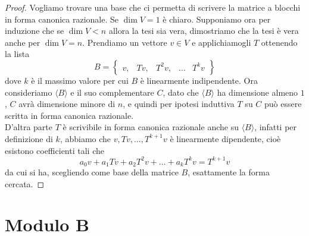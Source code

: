 \documentclass[11pt]{scrartcl}
\begin{document}
   	 \begin{proof}
   	 	Vogliamo trovare una base che ci permetta di scrivere la matrice a blocchi in forma canonica razionale. Se $\dim V=1$ è chiaro. Supponiamo ora per induzione che se $\dim V < n$ allora la tesi sia vera, dimostriamo che la tesi è vera anche per $\dim V=n$. Prendiamo un vettore $v\in V$ e applichiamogli $T$ ottenendo la lista
   	 	$$B=\left\{
   	 	\begin{array}{ccccc}
   	 		v, & Tv, & T^2v, & \dots & T^kv
   	 	\end{array}\right\}
   	 	$$
   	 	dove $k$ è il massimo valore per cui $B$ è linearmente indipendente. Ora consideriamo $\langle B \rangle$ e il suo complementare $C$, dato che $\langle B \rangle$ ha dimensione almeno $1$, $C$ avrà dimensione minore di $n$, e quindi per ipotesi induttiva $T$ su $C$ può essere scritta in forma canonica razionale. \\
   	 	D'altra parte $T$ è scrivibile in forma canonica razionale anche su $\langle B \rangle$, infatti per definizione di $k$, abbiamo che $v,Tv,\dots,T^{k+1}v$ è linearmente dipendente, cioè esistono coefficienti tali che 
   	 	$$a_0v+a_1Tv+a_2T^2v+\dots+a_kT^kv=T^{k+1}v$$
   	 	da cui si ha, scegliendo come base della matrice $B$, esattamente la forma cercata.
   	 \end{proof}
   	 \newpage
   	 
   	 \part{Modulo B}
   	 
\end{document}
